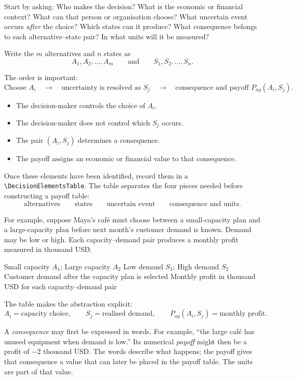 	Start by asking: Who makes the decision? What is the economic or financial
	context? What can that person or organisation choose? What uncertain event
	occurs \emph{after} the choice? Which states can it produce? What consequence
	belongs to each alternative--state pair? In what units will it be measured?
	
	Write the \(m\) alternatives and \(n\) states as
	\[
	A_1,A_2,\ldots,A_m
	\qquad\text{and}\qquad
	S_1,S_2,\ldots,S_n.
	\]
	
	The order is important:
	\[
	\text{Choose }A_i
	\quad\longrightarrow\quad
	\text{uncertainty is resolved as }S_j
	\quad\longrightarrow\quad
	\text{consequence and payoff }P_{ay}(A_i,S_j).
	\]
	
	\begin{itemize}
		\item The decision-maker controls the choice of \(A_i\).
		\item The decision-maker does not control which \(S_j\) occurs.
		\item The pair \((A_i,S_j)\) determines a consequence.
		\item The payoff assigns an economic or financial value to that consequence.
	\end{itemize}
	
	Once these elements have been identified, record them in a
	\verb|\DecisionElementsTable|. The table separates the four pieces needed
	before constructing a payoff table:
	\[
	\boxed{\text{alternatives}}
	\qquad
	\boxed{\text{states}}
	\qquad
	\boxed{\text{uncertain event}}
	\qquad
	\boxed{\text{consequence and units}}.
	\]
	
	For example, suppose Maya's café must choose between a small-capacity plan
	and a large-capacity plan before next month's customer demand is known.
	Demand may be low or high. Each capacity--demand pair produces a monthly
	profit measured in thousand USD.
	
	\DecisionElementsTable
	{Small capacity $A_1$; Large capacity $A_2$}
	{Low demand $S_1$; High demand $S_2$}
	{Customer demand after the capacity plan is selected}
	{Monthly profit in thousand USD for each capacity--demand pair}
	
	The table makes the abstraction explicit:
	\[
	A_i=\text{capacity choice},
	\qquad
	S_j=\text{realised demand},
	\qquad
	P_{ay}(A_i,S_j)=\text{monthly profit}.
	\]
	
	A \emph{consequence} may first be expressed in words. For example,
	``the large café has unused equipment when demand is low.'' Its numerical
	\emph{payoff} might then be a profit of \(-2\) thousand USD. The words
	describe what happens; the payoff gives that consequence a value that can
	later be placed in the payoff table. The units are part of that value.
	
